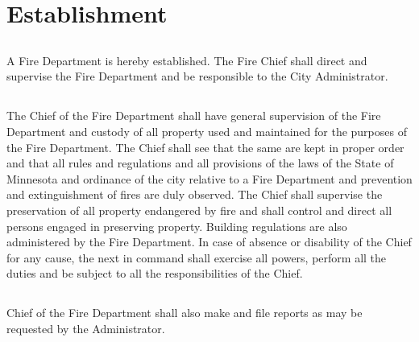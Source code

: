 \setcounter{section}{39}
\section{Establishment}
\subsection{}
A Fire Department is hereby established.  The Fire Chief shall direct and supervise the Fire Department and be responsible to the City Administrator.
\subsection{}
The Chief of the Fire Department shall have general supervision of the Fire Department and custody of all property used and maintained for the purposes of the Fire Department.  The Chief shall see that the same are kept in proper order and that all rules and regulations and all provisions of the laws of the State of Minnesota and ordinance of the city relative to a Fire Department and prevention and extinguishment of fires are duly observed.  The Chief shall supervise the preservation of all property endangered by fire and shall control and direct all persons engaged in preserving property.  Building regulations are also administered by the Fire Department. In case of absence or disability of the Chief for any cause, the next in command shall exercise all powers, perform all the duties and be subject to all the responsibilities of the Chief.
\subsection{}
Chief of the Fire Department shall also make and file reports as may be requested by the Administrator.
